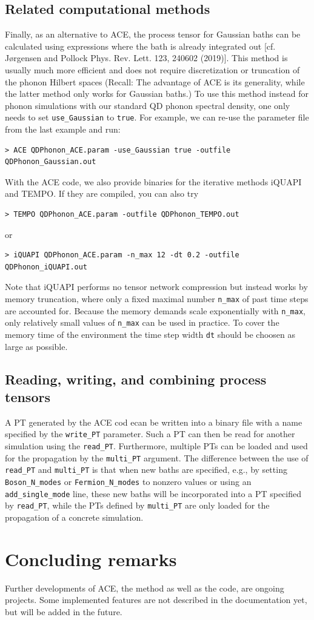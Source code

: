 \documentclass{scrartcl}
\begin{document}
\subsection{Related computational methods}
Finally, as an alternative to ACE, the process tensor for Gaussian baths can be 
calculated using expressions where the bath is already integrated out
[cf. {J{\o}rgensen and Pollock} Phys. Rev. Lett. 123, 240602 (2019)]. 
This method is usually much more 
efficient and does not require discretization or truncation of the phonon
Hilbert spaces (Recall: The advantage of ACE is its generality, while 
the latter method only works for Gaussian baths.)
To use this method instead for phonon simulations with our standard QD
phonon spectral density, one only needs to set \verb+use_Gaussian+ to 
\verb+true+. For example, we can re-use the parameter file from the
last example and run:

\begin{verbatim}
> ACE QDPhonon_ACE.param -use_Gaussian true -outfile QDPhonon_Gaussian.out
\end{verbatim}

With the ACE code, we also provide binaries for the iterative methods 
iQUAPI and TEMPO. If they are compiled, you can also try
\begin{verbatim}
> TEMPO QDPhonon_ACE.param -outfile QDPhonon_TEMPO.out
\end{verbatim}
or
\begin{verbatim}
> iQUAPI QDPhonon_ACE.param -n_max 12 -dt 0.2 -outfile QDPhonon_iQUAPI.out
\end{verbatim}
Note that iQUAPI performs no tensor network compression but instead 
works by memory truncation, where only a fixed maximal number
\verb+n_max+ of past time steps are accounted for.
Because the memory demands scale exponentially with \verb+n_max+, 
only relatively small values of \verb+n_max+ can be used in practice.
To cover the memory time of the environment the time step width \verb+dt+ 
should be choosen as large as possible.

\subsection{Reading, writing, and combining process tensors}

A PT generated by the ACE cod ecan be written into a binary file with a name
specified by the \verb+write_PT+ parameter. Such a PT can then be read 
for another simulation using the \verb+read_PT+. 
Furthermore, multiple PTs can be loaded and used for the propagation by the
\verb+multi_PT+ argument. The difference between the use of \verb+read_PT+ 
and \verb+multi_PT+ is that when new baths are specified, e.g., by setting 
\verb+Boson_N_modes+ or \verb+Fermion_N_modes+ to nonzero values or using 
an \verb+add_single_mode+ line, these new baths will be incorporated into
a PT specified by \verb+read_PT+, while the PTs defined by \verb+multi_PT+ 
are only loaded for the propagation of a concrete simulation.

\section{Concluding remarks}
Further developments of ACE, the method as well as the code, 
are ongoing projects. Some implemented features are not described in the 
documentation yet, but will be added in the future.
\end{document}
